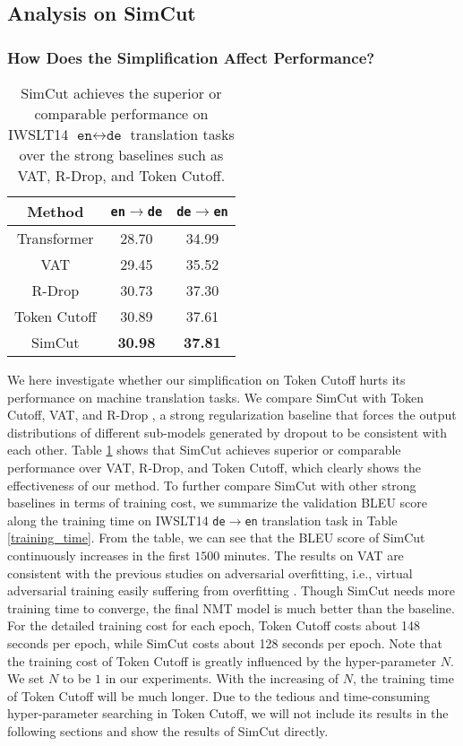 \documentclass[11pt]{article}
\begin{document}
\subsection{Analysis on SimCut}

\subsubsection{How Does the Simplification Affect Performance?}

\begin{table}
\centering
\begin{tabular}{c|c|c}
\hline
Method & \texttt{en}$\rightarrow$\texttt{de} & \texttt{de}$\rightarrow$\texttt{en} \\
\hline\hline
Transformer & 28.70 & 34.99 \\
VAT & 29.45 & 35.52 \\
R-Drop & 30.73 & 37.30 \\
Token Cutoff & 30.89 & 37.61 \\
\hline
SimCut & \bf 30.98 & \bf 37.81 \\
\end{tabular}
\caption{SimCut achieves the superior or comparable performance on IWSLT14 $\texttt{en}\leftrightarrow\texttt{de}$ translation tasks over the strong baselines such as VAT, R-Drop, and Token Cutoff. \label{simplification}}
\end{table}

We here investigate whether our simplification on Token Cutoff hurts its performance on machine translation tasks. We compare SimCut with Token Cutoff, VAT, and R-Drop \cite{liang2021r}, a strong regularization baseline that forces the output distributions of different sub-models generated by dropout to be consistent with each other. Table \ref{simplification} shows that SimCut achieves superior or comparable performance over VAT, R-Drop, and Token Cutoff, which clearly shows the effectiveness of our method. To further compare SimCut with other strong baselines in terms of training cost, we summarize the validation BLEU score along the training time on IWSLT14 \texttt{de}$\rightarrow$\texttt{en} translation task in Table \ref{training_time}. From the table, we can see that the BLEU score of SimCut continuously increases in the first $1500$ minutes. The results on VAT are consistent with the previous studies on adversarial overfitting, i.e., virtual adversarial training easily suffering from overfitting \cite{rice2020overfitting}. Though SimCut needs more training time to converge, the final NMT model is much better than the baseline. For the detailed training cost for each epoch, Token Cutoff costs about 148 seconds per epoch, while SimCut costs about 128 seconds per epoch. Note that the training cost of Token Cutoff is greatly influenced by the hyper-parameter $N$. We set $N$ to be $1$ in our experiments. With the increasing of $N$, the training time of Token Cutoff will be much longer. Due to the tedious and time-consuming hyper-parameter searching in Token Cutoff, we will not include its results in the following sections and show the results of SimCut directly.
\end{document}
